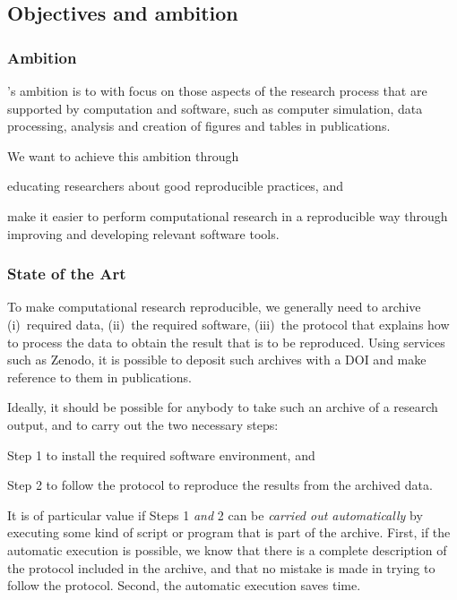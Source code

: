 \subsection{Objectives and ambition}

\subsubsection{Ambition}

\TheProject's ambition is to  with focus on those aspects of the research process that
are supported by computation and software, such as computer simulation, data
processing, analysis and creation of figures and tables in publications.

We want to achieve this ambition through
\begin{compactitem}
\item educating researchers about good reproducible practices, and
\item make it easier to perform computational research in a reproducible way
  through improving and developing relevant software tools.
\end{compactitem}

\subsubsection{State of the Art}

To make computational research reproducible, we generally need to archive
(i)~required data, (ii)~the required software, (iii)~the protocol that explains
how to process the data to obtain the result that is to be reproduced. Using
services such as Zenodo, it is possible to deposit such archives with a DOI and
make reference to them in publications.

Ideally, it should be possible for anybody to take such an archive of a research
output, and to carry out the two necessary steps:
\begin{compactitem}
\item Step 1 to install the required software environment, and
\item Step 2 to follow the protocol to reproduce the results from the archived data.
\end{compactitem}

It is of particular value if Steps 1 \emph{and} 2 can be \emph{carried out
  automatically} by executing some kind of script or program that is part of the
archive. First, if the automatic execution is possible, we know that there is a
complete description of the protocol included in the archive, and that no
mistake is made in trying to follow the protocol. Second, the automatic
execution saves time.

